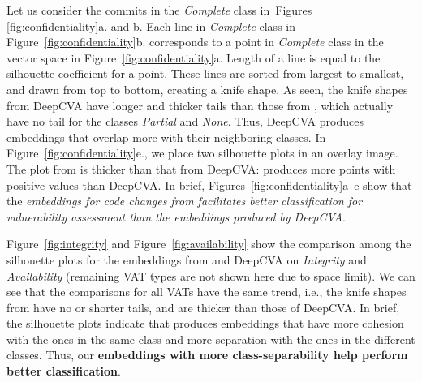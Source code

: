 Let us consider the commits in the {\em Complete} class
in~Figures \ref{fig:confidentiality}a. and b. Each line in {\em
Complete} class in Figure~\ref{fig:confidentiality}b. corresponds to a
point in {\em Complete} class in the vector space in
Figure~\ref{fig:confidentiality}a. Length of a line is equal to
the silhouette coefficient for a point. These lines are
sorted from largest to smallest, and drawn from top to bottom, creating
a knife shape. As seen, the knife shapes from DeepCVA have longer and thicker
tails than those from {\tool}, which actually have no tail for the
classes {\em Partial} and {\em None}. 
Thus, DeepCVA produces embeddings that overlap more with their
neighboring classes.  In Figure~\ref{fig:confidentiality}e., we place
two silhouette plots in an overlay image. The plot from {\tool} is
thicker than that from DeepCVA: {\tool} produces more points with
positive values than DeepCVA. In brief,
Figures~\ref{fig:confidentiality}a--e show that the {\em embeddings
for code changes from {\tool} facilitates better classification for
vulnerability assessment than the embeddings produced by DeepCVA}.



Figure~\ref{fig:integrity} and Figure~\ref{fig:availability} show the
comparison among the silhouette plots for the embeddings from {\tool}
and DeepCVA on {\em Integrity} and {\em Availability} (remaining VAT
types are not shown here due to space limit). We can see that the
comparisons for all VATs have the same trend, i.e., the knife shapes
from {\tool} have no or shorter tails, and are thicker than those of
DeepCVA. In brief, the silhouette plots indicate that {\tool} produces
embeddings that have more cohesion with the ones in the same class and
more separation with the ones in the different classes. Thus, our {\bf
  embeddings with more class-separability help {\tool} perform better
  classification}.



